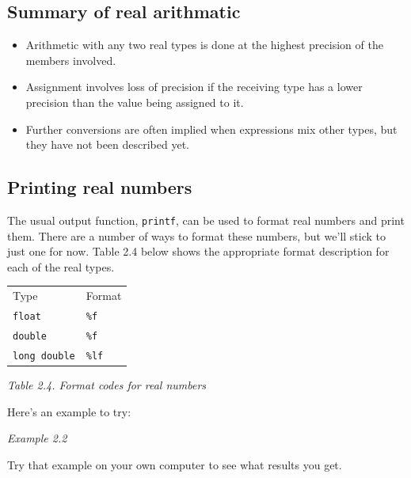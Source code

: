   \subsection{Summary of real arithmatic}

   \begin{itemize}
    \item Arithmetic with any two real types is done at the highest precision of
     the members involved.
    \item Assignment involves loss of precision if the receiving type has a lower
     precision than the value being assigned to it.
    \item Further conversions are often implied when expressions mix other types,
     but they have not been described yet.
   \end{itemize}

  

  \subsection{Printing real numbers}
   

   The usual output function, \texttt{printf}, can be used to format
    real numbers and print them. There are a number of ways to format these
    numbers, but we'll stick to just one for now. Table 2.4 below
    shows the appropriate format description for each of the real types.


   \begin{tabular}{lp{\textwidth}}
     Type & Format
    \\

     \texttt{float} & \texttt{\%f}
    \\

     \texttt{double} & \texttt{\%f}
    \\

     \texttt{long double} & \texttt{\%lf}
    \\
\end{tabular}

\begin{center}\textit{Table 2.4. Format codes for real numbers}\end{center}


   Here's an example to try:


   \begin{center}\textit{Example 2.2}\end{center}


   Try that example on your own computer to see what results you get.


